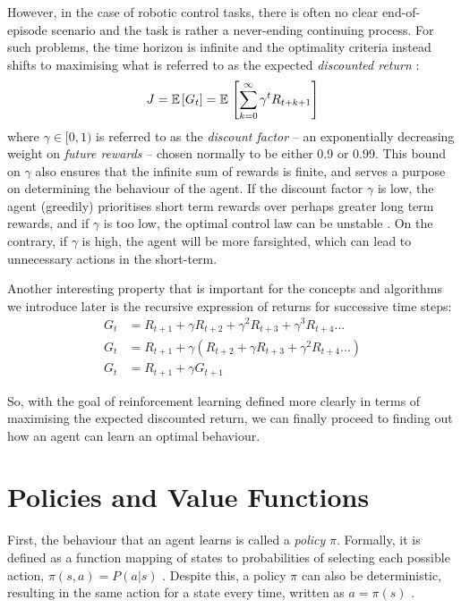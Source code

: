 However, in the case of robotic control tasks, there is often no clear end-of-episode scenario and the task is rather a never-ending continuing process. For such problems, the time horizon is infinite and the optimality criteria instead shifts to maximising what is referred to as the expected \textit{discounted return} \cite{suttonAndBartoBook}:
\begin{equation}
    J = \mathbb{E} \hspace{0.5mm}[G_t] = \mathbb{E} \hspace{0.5mm} \left[ \sum^\infty_{k=0} \gamma^t R_{t+k+1} \label{eq:2_3_discReturn} \right]
\end{equation}
where $\gamma \in [0,1)$ is referred to as the \textit{discount factor} -- an exponentially decreasing weight on \textit{future rewards} -- chosen normally to be either 0.9 or 0.99. This bound on $\gamma$ also ensures that the infinite sum of rewards is finite, and serves a purpose on determining the behaviour of the agent. If the discount factor $\gamma$ is low, the agent (greedily) prioritises short term rewards over perhaps greater long term rewards, and if $\gamma$ is too low, the optimal control law can be unstable \cite{RLinRoboticsSurvey}. On the contrary, if $\gamma$ is high, the agent will be more farsighted, which can lead to unnecessary actions in the short-term. 

Another interesting property that is important for the concepts and algorithms we introduce later is the recursive expression of returns for successive time steps:
\begin{align}
    G_t &= R_{t+1} + \gamma R_{t+2} + \gamma^2 R_{t+3} + \gamma^3 R_{t+4} ... \nonumber \\
    G_t &= R_{t+1} + \gamma (R_{t+2} + \gamma R_{t+3} + \gamma^2 R_{t+4} ...) \nonumber \\
    G_t &= R_{t+1} + \gamma G_{t+1} \label{Eq:2_1_RecReturns} 
\end{align}

So, with the goal of reinforcement learning defined more clearly in terms of maximising the expected discounted return, we can finally proceed to finding out how an agent can learn an optimal behaviour.

\section{Policies and Value Functions}
\label{sec:2_PoliciesValueFunc}

First, the behaviour that an agent learns is called a \textit{policy} $\pi$. Formally, it is defined as a function mapping of states to probabilities of selecting each possible action, $\pi(s,a) = P(a|s)$ \cite{suttonAndBartoBook}. Despite this, a policy $\pi$ can also be deterministic, resulting in the same action for a state every time, written as $a = \pi(s)$ \cite{RLinRoboticsSurvey}.

